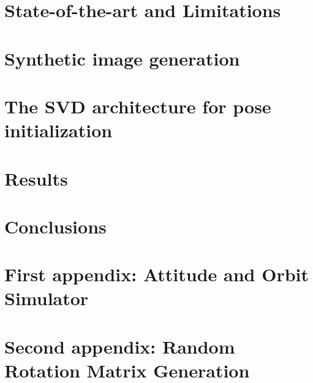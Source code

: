 \documentclass[a4paper,twoside,12pt]{book}
\begin{document}
\chapter{State-of-the-art and Limitations\label{chap:first-chapter}}

\cleardoublepage{}
\chapter{Synthetic image generation\label{chap:second-chapter}}

\cleardoublepage{}
\chapter{The SVD architecture for pose initialization\label{chap:third-chapter}}

\cleardoublepage{}
\chapter{Results\label{chap:fourth-chapter}}

\cleardoublepage{}

\chapter*{Conclusions}

\cleardoublepage{}



\cleardoublepage{}

\appendix
\chapter{First appendix: Attitude and Orbit Simulator \label{app:first-appendix}}

\cleardoublepage{}
\chapter{Second appendix: Random Rotation Matrix Generation \label{app:second-appendix}}

\cleardoublepage{}

\end{document}

